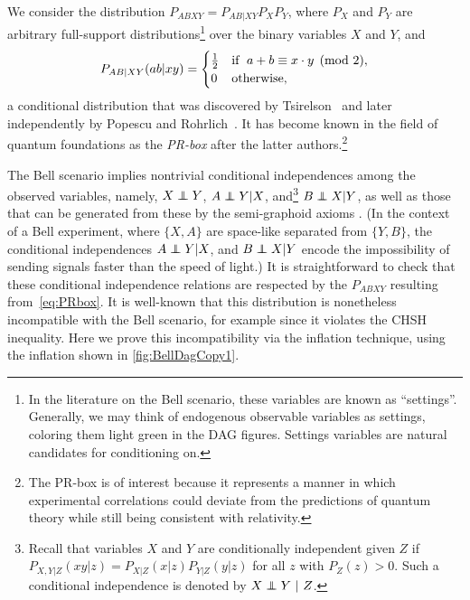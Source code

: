 We consider the distribution ${P_{A B X Y} = P_{A B | X Y} P_{X} P_{Y}}$, where $P_{X}$ and $P_{Y}$ are arbitrary full-support distributions\footnote{In the literature on the Bell scenario, these variables are known as ``settings''. Generally, we may think of endogenous observable variables as settings, coloring them light green in the DAG figures. Settings variables are natural candidates for conditioning on.} over the binary variables $X$ and $Y$, and
\begin{align}\begin{split}\label{eq:PRbox}
P_{A B | X Y}\lparen a b |x y\rparen=\begin{cases}\tfrac{1}{2}&\text{if }\; a + b \equiv x \cdot y \pmod{2}, \\ 0&\text{otherwise},\end{cases}
\end{split}\end{align}
a conditional distribution that was discovered by Tsirelson~\cite{Tsirelson1980} and later independently by Popescu and Rohrlich~\cite{PROriginal,PRUnit}. It has become known in the field of quantum foundations as the \emph{PR-box} after the latter authors.\footnote{The PR-box is of interest because it represents a manner in which experimental correlations could deviate from the predictions of quantum theory while still being consistent with relativity.}


The Bell scenario implies nontrivial conditional independences among the observed variables, namely, $X \perp\!\!\!\!\perp Y$, $A \perp\!\!\!\!\perp Y| X$, and\footnote{Recall that variables $X$ and $Y$ are conditionally independent given $Z$ if $P_{X,Y|Z}(xy|z) = P_{X|Z}(x|z) P_{Y|Z}(y|z)$ for all $z$ with $P_{Z}(z)>0$. Such a conditional independence is denoted by $X\perp\!\!\!\!\perp Y\text{ }|\text{ }Z$.} $B \perp\!\!\!\!\perp X|Y$, as well as those that can be generated from these by the semi-graphoid axioms \cite{WoodSpekkens}.
(In the context of a Bell experiment, where $\{X,A\}$ are space-like separated from $\{Y,B\}$, the conditional independences $A \perp\!\!\!\!\perp Y| X$, and $B \perp\!\!\!\!\perp X|Y$ encode the impossibility of sending signals faster than the speed of light.) It is straightforward to check that these conditional independence relations are respected by the $P_{ABXY}$ resulting from~\cref{eq:PRbox}. It is well-known that this distribution is nonetheless incompatible with the Bell scenario, for example since it violates the CHSH inequality.
Here we prove this incompatibility via the inflation technique, using the inflation shown in \cref{fig:BellDagCopy1}.

